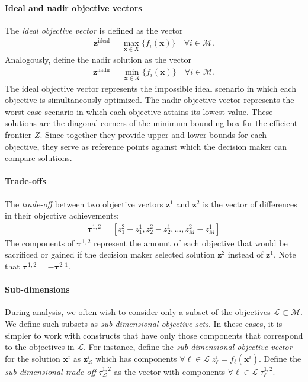 \paragraph{Ideal and nadir objective vectors}
The \textit{ideal objective vector} is defined as the vector
\begin{align}
\mathbf{z}^{\text{ideal}} = \max_{\mathbf{x} \in X}\{f_i(\mathbf{x})\} \quad \forall i \in \mathcal{M}.
\end{align}
Analogously, define the nadir solution as the vector
\begin{align}
\mathbf{z}^{\text{nadir}} = \min_{\mathbf{x} \in X}\{f_i(\mathbf{x})\} \quad \forall i \in \mathcal{M}.
\end{align}
The ideal objective vector represents the impossible ideal scenario in which each objective is simultaneously optimized. The nadir objective vector represents the worst case scenario in which each objective attains its lowest value. These solutions are the diagonal corners of the minimum bounding box for the efficient frontier $Z$. Since together they provide upper and lower bounds for each objective, they serve as reference points against which the decision maker can compare solutions. 

\paragraph{Trade-offs}
The \textit{trade-off} between two objective vectors $\mathbf{z}^1$ and $\mathbf{z}^2$ is the vector of differences in their objective achievements:
\begin{align}
\mathbf{\tau}^{1,2} = [z^2_1 - z^1_1, z^2_2 - z^1_2, \ldots, z^2_M - z^1_M]
\end{align}
The components of $\mathbf{\tau}^{1,2}$ represent the amount of each objective that would be sacrificed or gained if the decision maker selected solution $\mathbf{z}^2$ instead of $\mathbf{z}^1$.
Note that $\mathbf{\tau}^{1,2} = - \mathbf{\tau}^{2,1}$. 

\paragraph{Sub-dimensions}
During analysis, we often wish to consider only a subset of the objectives $\mathcal{L} \subset\mathcal{M}$. We define such subsets as \textit{sub-dimensional objective sets}. In these cases, it is simpler to work with constructs that have only those components that correspond to the objectives in $\mathcal{L}$. For instance, define the \textit{sub-dimensional objective vector} for the solution $\mathbf{x}^i$ as $\mathbf{z}^i_\mathcal{L}$ which has components $\forall \ell \in \mathcal{L} \; z^i_\ell = f_\ell(\mathbf{x}^i)$.
Define the \textit{sub-dimensional trade-off} $\tau^{1,2}_\mathcal{L}$ as the vector with components $\forall \ell \in \mathcal{L} \; \tau^{1,2}_\ell$.

